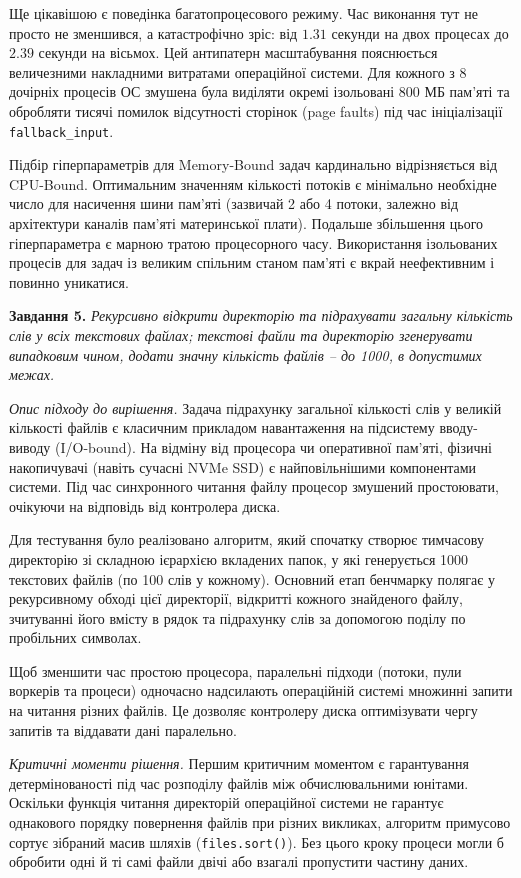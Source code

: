 \documentclass[14pt, a4paper]{extreport}
\begin{document}
	
	Ще цікавішою є поведінка багатопроцесового режиму. Час виконання тут не просто не зменшився, а катастрофічно зріс: від $1.31$ секунди на двох процесах до $2.39$ секунди на вісьмох. Цей антипатерн масштабування пояснюється величезними накладними витратами операційної системи. Для кожного з 8 дочірніх процесів ОС змушена була виділяти окремі ізольовані 800 МБ пам'яті та обробляти тисячі помилок відсутності сторінок (page faults) під час ініціалізації \texttt{fallback\_input}. 
	
	Підбір гіперпараметрів для Memory-Bound задач кардинально відрізняється від CPU-Bound. Оптимальним значенням кількості потоків є мінімально необхідне число для насичення шини пам'яті (зазвичай 2 або 4 потоки, залежно від архітектури каналів пам'яті материнської плати). Подальше збільшення цього гіперпараметра є марною тратою процесорного часу. Використання ізольованих процесів для задач із великим спільним станом пам'яті є вкрай неефективним і повинно уникатися.
	
	\textbf{Завдання 5.} \textit{Рекурсивно відкрити директорію та підрахувати загальну кількість слів у всіх текстових файлах; текстові файли та директорію згенерувати випадковим чином, додати значну кількість файлів -- до 1000, в допустимих межах.}
	
	\textit{Опис підходу до вирішення.}
	Задача підрахунку загальної кількості слів у великій кількості файлів є класичним прикладом навантаження на підсистему вводу-виводу (I/O-bound). На відміну від процесора чи оперативної пам'яті, фізичні накопичувачі (навіть сучасні NVMe SSD) є найповільнішими компонентами системи. Під час синхронного читання файлу процесор змушений простоювати, очікуючи на відповідь від контролера диска.
	
	Для тестування було реалізовано алгоритм, який спочатку створює тимчасову директорію зі складною ієрархією вкладених папок, у які генерується 1000 текстових файлів (по 100 слів у кожному). Основний етап бенчмарку полягає у рекурсивному обході цієї директорії, відкритті кожного знайденого файлу, зчитуванні його вмісту в рядок та підрахунку слів за допомогою поділу по пробільних символах.
	
	Щоб зменшити час простою процесора, паралельні підходи (потоки, пули воркерів та процеси) одночасно надсилають операційній системі множинні запити на читання різних файлів. Це дозволяє контролеру диска оптимізувати чергу запитів та віддавати дані паралельно.
	
	\textit{Критичні моменти рішення.}
	Першим критичним моментом є гарантування детермінованості під час розподілу файлів між обчислювальними юнітами. Оскільки функція читання директорій операційної системи не гарантує однакового порядку повернення файлів при різних викликах, алгоритм примусово сортує зібраний масив шляхів (\texttt{files.sort()}). Без цього кроку процеси могли б обробити одні й ті самі файли двічі або взагалі пропустити частину даних.
	
\end{document}
